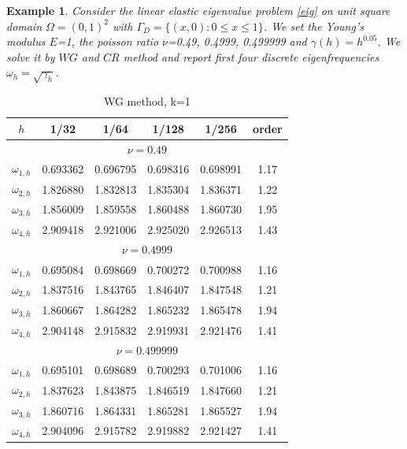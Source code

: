 \documentclass[leqno,CJK]{siamltex704}
\numberwithin{equation}{section}
\newtheorem{example}{Example}[section]
\begin{document}
\begin{example}
	Consider the linear elastic eigenvalue problem \eqref{eig} on unit square domain $\Omega=(0,1)^2$ with $\Gamma_D=\{(x,0):0\le x\le1\}$. We set the Young's modulus $E$=1, the poisson ratio $\nu$=0.49, 0.4999, 0.499999 and $\gamma(h)=h^{0.05}$. We solve it by $WG$ and $CR$ method and report first four discrete eigenfrequencies $\omega_h=\sqrt{\gamma_h}$.
\end{example}
\begin{table}[H]
	\begin{center}
		\caption{WG method, k=1}\label{t5}
		\begin{tabular}{|c|c|c|c|c|c|}\hline
				$h$&1/32&1/64&1/128&1/256&order\\ \hline\hline
		\multicolumn{6}{|c|}{$\nu=0.49$}\\ \hline		
				$\omega_{1,h}$&0.693362 & 0.696795 & 0.698316 & 0.698991 & 1.17 \\ \hline
				$\omega_{2,h}$&1.826880 & 1.832813 & 1.835304 & 1.836371 & 1.22 \\ \hline
				$\omega_{3,h}$&1.856009 & 1.859558 & 1.860488 & 1.860730 & 1.95 \\ \hline
				$\omega_{4,h}$&2.909418 & 2.921006 & 2.925020 & 2.926513 & 1.43 \\ \hline
		\multicolumn{6}{|c|}{$\nu=0.4999$}\\ \hline
				$\omega_{1,h}$&0.695084 & 0.698669 & 0.700272 & 0.700988 & 1.16 \\ \hline
				$\omega_{2,h}$&1.837516 & 1.843765 & 1.846407 & 1.847548 & 1.21 \\ \hline
				$\omega_{3,h}$&1.860667 & 1.864282 & 1.865232 & 1.865478 & 1.94 \\ \hline
				$\omega_{4,h}$&2.904148 & 2.915832 & 2.919931 & 2.921476 & 1.41 \\ \hline
		\multicolumn{6}{|c|}{$\nu=0.499999$}\\ \hline
			$\omega_{1,h}$&0.695101 & 0.698689 & 0.700293 & 0.701006 & 1.16 \\ \hline
			$\omega_{2,h}$&1.837623 & 1.843875 & 1.846519 & 1.847660 & 1.21 \\ \hline
			$\omega_{3,h}$&1.860716 & 1.864331 & 1.865281 & 1.865527 & 1.94 \\ \hline
			$\omega_{4,h}$&2.904096 & 2.915782 & 2.919882 & 2.921427 & 1.41 \\ \hline
		\end{tabular}
	\end{center}
\end{table}
\end{document}
